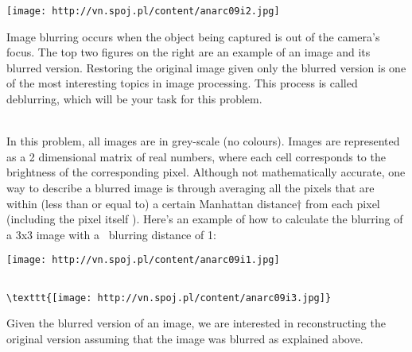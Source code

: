\texttt{[image: http://vn.spoj.pl/content/anarc09i2.jpg]}

   Image blurring occurs when the object being captured is out of the camera’s focus. The top two figures on the right are an example of an image and its blurred version. Restoring the original image given only the blurred version is one of the most interesting topics in image processing. This process is called deblurring, which will be your task for this problem.  


\\   In this problem, all images are in grey-scale (no colours). Images are represented as a 2 dimensional matrix of real numbers, where each cell corresponds to the  brightness of the corresponding pixel. Although not mathematically accurate, one way to describe a blurred image is through averaging all the pixels that are within (less than or equal to) a certain Manhattan distance† from each pixel (including the pixel itself ). Here’s an example of how to calculate the blurring of a 3x3 image with a  blurring distance of 1:  


\texttt{[image: http://vn.spoj.pl/content/anarc09i1.jpg]}
\begin{verbatim}

\texttt{[image: http://vn.spoj.pl/content/anarc09i3.jpg]}\end{verbatim}

   Given the blurred version of an image, we are interested in reconstructing the original version assuming that the image was blurred as explained above.  

\